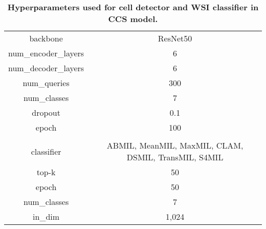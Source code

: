 \clearpage
\begin{table}[h] 
\renewcommand{\arraystretch}{1.5}
\renewcommand{\tablename}{Extended Data Table.}
\centering 
\caption{\textbf{Hyperparameters used for cell detector and WSI classifier in CCS model.}}
\begin{tabular}{c|c} 
\hline
 \rowcolor{cusyellow} \multicolumn{2}{c}{\multirow{1}{*}{\textbf{Abnormal Cell Detector}}} \\ 
\hline
backbone & ResNet50\\ 
 \rowcolor{cusyellowl} num\_encoder\_layers & 6\\ 
num\_decoder\_layers & 6\\ 
 \rowcolor{cusyellowl} num\_queries & 300\\ 
num\_classes & 7\\ 
 \rowcolor{cusyellowl} dropout & 0.1\\ 
epoch & 100\\ 

\hline
 \rowcolor{cusyellow} \multicolumn{2}{c}{\multirow{1}{*}{\textbf{WSI Classifier}}} \\ 
\hline
classifier & ABMIL, MeanMIL, MaxMIL, CLAM, DSMIL, TransMIL, S4MIL\\ 
 \rowcolor{cusyellowl} top-k & 50\\ 
epoch & 50\\ 
 \rowcolor{cusyellowl} num\_classes & 7\\ 
in\_dim & 1,024\\ 
\hline 
\end{tabular} 
\label{ST_det_para}
\end{table}

